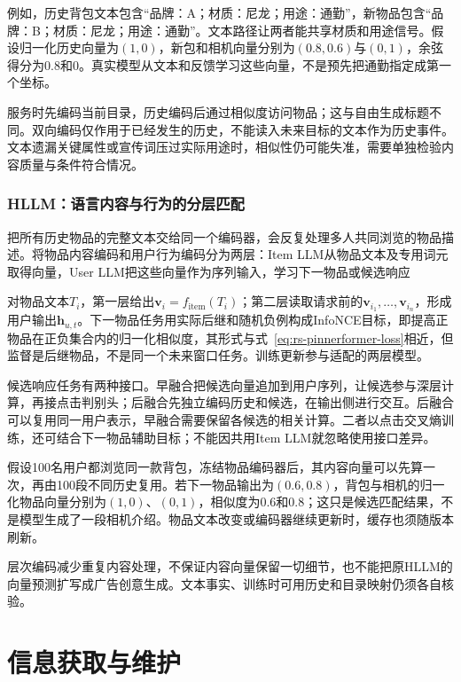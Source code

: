 例如，历史背包文本包含“品牌：A；材质：尼龙；用途：通勤”，新物品包含“品牌：B；材质：尼龙；用途：通勤”。文本路径让两者能共享材质和用途信号。假设归一化历史向量为$(1,0)$，新包和相机向量分别为$(0.8,0.6)$与$(0,1)$，余弦得分为0.8和0。真实模型从文本和反馈学习这些向量，不是预先把通勤指定成第一个坐标。

服务时先编码当前目录，历史编码后通过相似度访问物品；这与自由生成标题不同。双向编码仅作用于已经发生的历史，不能读入未来目标的文本作为历史事件。文本遗漏关键属性或宣传词压过实际用途时，相似性仍可能失准，需要单独检验内容质量与条件符合情况。

\subsubsection{HLLM：语言内容与行为的分层匹配}
\label{sec:rs-hllm}

把所有历史物品的完整文本交给同一个编码器，会反复处理多人共同浏览的物品描述。将物品内容编码和用户行为编码分为两层：Item LLM从物品文本及专用词元取得向量，User LLM把这些向量作为序列输入，学习下一物品或候选响应

对物品文本$T_i$，第一层给出$\bm{v}_i=f_{\mathrm{item}}(T_i)$；第二层读取请求前的$\bm{v}_{i_1},\ldots,\bm{v}_{i_n}$，形成用户输出$\bm{h}_{u,t}$。下一物品任务用实际后继和随机负例构成InfoNCE目标，即提高正物品在正负集合内的归一化相似度，其形式与式~\eqref{eq:rs-pinnerformer-loss}相近，但监督是后继物品，不是同一个未来窗口任务。训练更新参与适配的两层模型。

候选响应任务有两种接口。早融合把候选向量追加到用户序列，让候选参与深层计算，再接点击判别头；后融合先独立编码历史和候选，在输出侧进行交互。后融合可以复用同一用户表示，早融合需要保留各候选的相关计算。二者以点击交叉熵训练，还可结合下一物品辅助目标；不能因共用Item LLM就忽略使用接口差异。

假设100名用户都浏览同一款背包，冻结物品编码器后，其内容向量可以先算一次，再由100段不同历史复用。若下一物品输出为$(0.6,0.8)$，背包与相机的归一化物品向量分别为$(1,0)$、$(0,1)$，相似度为0.6和0.8；这只是候选匹配结果，不是模型生成了一段相机介绍。物品文本改变或编码器继续更新时，缓存也须随版本刷新。

层次编码减少重复内容处理，不保证内容向量保留一切细节，也不能把原HLLM的向量预测扩写成广告创意生成。文本事实、训练时可用历史和目录映射仍须各自核验。

\section{信息获取与维护}
\label{sec:rs-evidence-maintenance}

